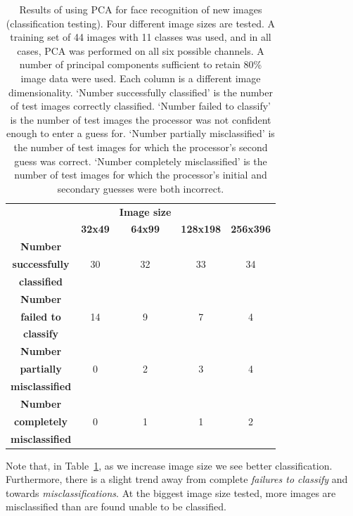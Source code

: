 \begin{table}[h!]
  \centering
  \begin{tabular}{c c c c c}
    \toprule
    \textbf{ } & \textbf{} & \textbf{Image size} & \textbf{} & \textbf{}\\
    \textbf{ } & \textbf{ 32x49 } & \textbf{ 64x99 } & \textbf{128x198} & \textbf{256x396}\\
    \midrule
    \textbf{Number} & {} & {} & {} & {} \\
    \textbf{successfully} & 30 & 32 & 33 & 34\\
    \textbf{classified} & {} & {} & {} & {} \\
    \midrule
    \textbf{Number} & {} & {} & {} & {} \\
    \textbf{failed to} & 14 & 9 & 7 & 4\\
    \textbf{classify} & {} & {} & {} & {} \\
    \midrule
    \textbf{Number} & {} & {} & {} & {} \\
    \textbf{partially} & 0 & 2 & 3 & 4\\
    \textbf{misclassified} & {} & {} & {} & {} \\
    \midrule
    \textbf{Number} & {} & {} & {} & {} \\
    \textbf{completely} & 0 & 1 & 1 & 2\\
    \textbf{misclassified} & {} & {} & {} & {} \\
    \bottomrule
  \end{tabular}
  \caption[Results of classification testing for different-sized images]{Results of using PCA for face recognition of new images (classification testing). Four different image sizes are tested. A training set of 44 images with 11 classes was used, and in all cases, PCA was performed on all six possible channels. A number of principal components sufficient to retain 80\% image data were used. Each column is a different image dimensionality. `Number successfully classified' is the number of test images correctly classified. `Number failed to classify' is the number of test images the processor was not confident enough to enter a guess for. `Number partially misclassified' is the number of test images for which the processor's second guess was correct. `Number completely misclassified' is the number of test images for which the processor's initial and secondary guesses were both incorrect.}
  \label{tbl:face-rec-3}
\end{table}

Note that, in Table~\ref{tbl:face-rec-3}, as we increase image size we see better classification. Furthermore, there is a slight trend away from complete \emph{failures to classify} and towards \emph{misclassifications}. At the biggest image size tested, more images are misclassified than are found unable to be classified.


